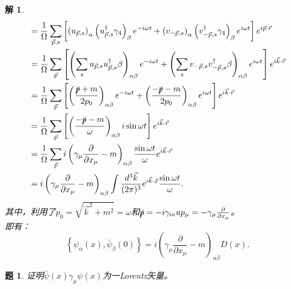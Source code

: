 \documentclass[UTF8,10pt,a4paper]{article}
\theoremstyle{Problem}%
\newtheorem{prob}{题}%
\theoremstyle{Solution}%
\newtheorem*{sol}{解}%
\begin{document}
\begin{sol}
\[\begin{aligned}
    &= \frac{1}{\Omega} \sum_{\vec{p},s} \left[ \left( u_{\vec{p},s} \right)_\alpha \left(u_{\vec{p},s}^\dagger \gamma_4 \right)_\beta e^{-i\omega t} + \left( v_{-\vec{p},s} \right)_\alpha \left( v_{-\vec{p},s}^\dagger\gamma_4 \right)_\beta e^{i\omega t} \right] e^{i\vec{p}\cdot\vec{r}} \\
    &= \frac{1}{\Omega} \sum_{\vec{p}} \left[ \left(\sum_s u_{\vec{p},s} u_{\vec{p},s}^\dagger \beta\right)_{\alpha\beta}e^{-i\omega t} + \left(\sum_s v_{-\vec{p},s} v_{-\vec{p},s}^\dagger \beta\right)_{\alpha\beta}e^{i\omega t} \right] e^{i\vec{k}\cdot\vec{r}} \\
    &= \frac{1}{\Omega} \sum_{\vec{p}} \left[ \left(\frac{\slashed{p} + m}{2p_0}\right)_{\alpha\beta} e^{-i\omega t} + \left(\frac{-\slashed{p} - m}{2p_0}\right)_{\alpha\beta} e^{i\omega t} \right] e^{i\vec{k}\cdot\vec{r}} \\
    &= \frac{1}{\Omega} \sum_{\vec{p}} \left[ \left( \frac{-\slashed{p} - m}{\omega}\right)_{\alpha\beta}i\sin\omega t \right] e^{i\vec{k}\cdot\vec{r}} \\
    &= \frac{1}{\Omega} \sum_{\vec{p}} i\left( \gamma_\mu \frac{\partial }{\partial x_{\mu}} - m \right)_{\alpha\beta} \frac{\sin\omega t}{\omega} e^{i\vec{k}\cdot\vec{r}} \\
    &= i\left( \gamma_\mu \frac{\partial }{\partial x_{\mu}} - m \right)_{\alpha\beta} \int \frac{d^3\vec{k}}{(2\pi)^3} e^{i\vec{k}\cdot\vec{x}} \frac{\sin\omega t}{\omega}.
    \end{aligned}
\]
其中，利用了$p_0 = \sqrt{\vec{k}^2 + m^2} = \omega$和$\slashed{p} = -i\gamma_mu p_\mu = -\gamma_\mu \frac{\partial}{\partial x_\mu}$。 \\
即有：
\[
    \left\{ \psi_\alpha(x), \bar{\psi}_\beta(0) \right\} = i\left( \gamma_\mu \frac{\partial }{\partial x_{\mu}} - m \right)_{\alpha\beta} D(x).
\]
\end{sol}


\begin{prob}证明$\bar{\psi}(x)\gamma_\mu\psi(x)$为一Lorentz矢量。

\end{prob}
\end{document}
